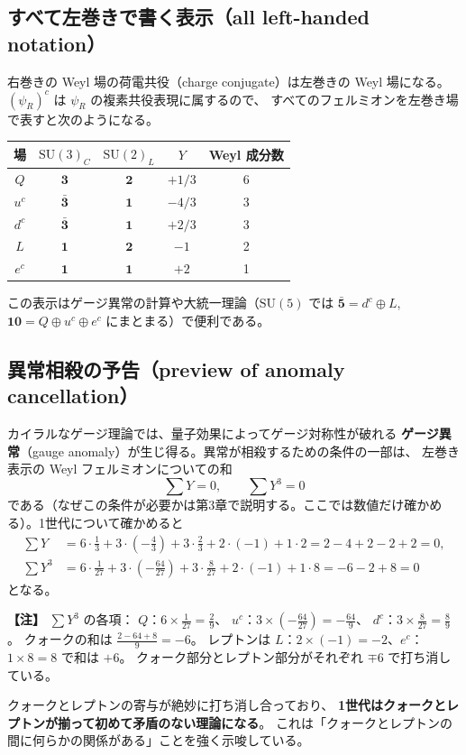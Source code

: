 \documentclass[uplatex,dvipdfmx,a4paper,11pt,openany]{jsbook}
\newcommand{\term}[2]{\textbf{#1}（#2）}
\newcommand{\en}[1]{（#1）}
\newenvironment{note}{\vspace{1ex}\par\footnotesize\noindent\textbf{【注】}}{\par\vspace{1ex}}
\numberwithin{equation}{chapter}
\theoremstyle{definition}
\theoremstyle{plain}
\theoremstyle{remark}
\newcommand{\SU}{\mathrm{SU}}
\begin{document}
\subsection{すべて左巻きで書く表示（all left-handed notation）}
右巻きの Weyl 場の荷電共役\en{charge conjugate}は左巻きの Weyl 場になる。
$(\psi_R)^c$ は $\psi_R$ の複素共役表現に属するので、
すべてのフェルミオンを左巻き場で表すと次のようになる。
\begin{center}
\renewcommand{\arraystretch}{1.3}
\begin{tabular}{ccccc}
\toprule
場 & $\SU(3)_C$ & $\SU(2)_L$ & $Y$ & Weyl 成分数\\
\midrule
$Q$ & $\mathbf{3}$ & $\mathbf{2}$ & $+1/3$ & 6\\
$u^c$ & $\bar{\mathbf{3}}$ & $\mathbf{1}$ & $-4/3$ & 3\\
$d^c$ & $\bar{\mathbf{3}}$ & $\mathbf{1}$ & $+2/3$ & 3\\
$L$ & $\mathbf{1}$ & $\mathbf{2}$ & $-1$ & 2\\
$e^c$ & $\mathbf{1}$ & $\mathbf{1}$ & $+2$ & 1\\
\bottomrule
\end{tabular}
\end{center}
この表示はゲージ異常の計算や大統一理論（$\SU(5)$ では
$\bar{\mathbf{5}}=d^c\oplus L$, $\mathbf{10}=Q\oplus u^c\oplus e^c$ にまとまる）で便利である。
\subsection{異常相殺の予告（preview of anomaly cancellation）}
カイラルなゲージ理論では、量子効果によってゲージ対称性が破れる
\term{ゲージ異常}{gauge anomaly}が生じ得る。異常が相殺するための条件の一部は、
左巻き表示の Weyl フェルミオンについての和
\begin{equation}
\sum Y=0,\qquad\sum Y^3=0
\end{equation}
である（なぜこの条件が必要かは第3章で説明する。ここでは数値だけ確かめる）。1世代について確かめると
\begin{align}
\sum Y&=
6\cdot\frac13+3\cdot\left(-\frac43\right)+3\cdot\frac23+2\cdot(-1)+1\cdot2
=2-4+2-2+2=0,\\
\sum Y^3&=
6\cdot\frac{1}{27}+3\cdot\left(-\frac{64}{27}\right)+3\cdot\frac{8}{27}+2\cdot(-1)+1\cdot8
=-6-2+8=0
\end{align}
となる。
\begin{note}
$\sum Y^3$ の各項：
$Q$：$6\times\frac1{27}=\frac29$、
$u^c$：$3\times(-\frac{64}{27})=-\frac{64}{9}$、
$d^c$：$3\times\frac8{27}=\frac89$。
クォークの和は $\frac{2-64+8}{9}=-6$。
レプトンは $L$：$2\times(-1)=-2$、$e^c$：$1\times8=8$ で和は $+6$。
クォーク部分とレプトン部分がそれぞれ $\mp6$ で打ち消している。
\end{note}
クォークとレプトンの寄与が絶妙に打ち消し合っており、
\textbf{1世代はクォークとレプトンが揃って初めて矛盾のない理論になる}。
これは「クォークとレプトンの間に何らかの関係がある」ことを強く示唆している。
\end{document}
